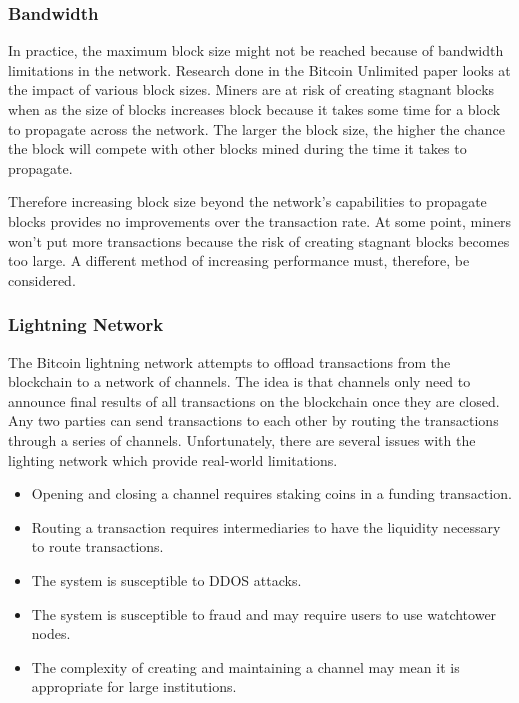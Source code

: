 \documentclass{article}
\begin{document}
\subsubsection{Bandwidth}

In practice, the maximum block size might not be reached because of bandwidth limitations
in the network. Research done in the Bitcoin Unlimited paper \cite{bitcoinunlimited} looks
at the impact of various block sizes. Miners are at risk of creating stagnant blocks 
when as the size of blocks increases block because it takes some time for a block to propagate
across the network. The larger the block size, the higher the chance the block will
compete with other blocks mined during the time it takes to propagate.

Therefore increasing block size beyond the network's capabilities to propagate blocks
provides no improvements over the transaction rate. At some point, miners won't put more
transactions because the risk of creating stagnant blocks becomes too large. A 
different method of increasing performance must, therefore, be considered.

\subsubsection{Lightning Network}

The Bitcoin lightning network attempts to offload transactions from the blockchain
to a network of channels. The idea is that channels only need to announce final
results of all transactions on the blockchain once they are closed. Any two parties
can send transactions to each other by routing the transactions through a series of
channels. Unfortunately, there are several issues with the lighting network which
provide real-world limitations.

\begin{itemize}
    \item Opening and closing a channel requires staking coins in a funding transaction.
    \item Routing a transaction requires intermediaries to have the liquidity necessary
        to route transactions.
    \item The system is susceptible to DDOS attacks.
    \item The system is susceptible to fraud and may require users to use watchtower 
        nodes.
    \item The complexity of creating and maintaining a channel may mean it is appropriate for large institutions.
\end{itemize}
\end{document}
